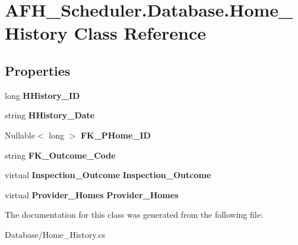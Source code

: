 \section{A\+F\+H\+\_\+\+Scheduler.\+Database.\+Home\+\_\+\+History Class Reference}
\label{class_a_f_h___scheduler_1_1_database_1_1_home___history}
\subsection*{Properties}
\begin{DoxyCompactItemize}
\item 
\mbox{\label{class_a_f_h___scheduler_1_1_database_1_1_home___history_a6df5c667b96b20f8f0eb28bf0d6c9b38}} 
long {\bfseries H\+History\+\_\+\+ID}\hspace{0.3cm}{\ttfamily  [get, set]}
\item 
\mbox{\label{class_a_f_h___scheduler_1_1_database_1_1_home___history_a6f54a9944d339511f33002573f4413a7}} 
string {\bfseries H\+History\+\_\+\+Date}\hspace{0.3cm}{\ttfamily  [get, set]}
\item 
\mbox{\label{class_a_f_h___scheduler_1_1_database_1_1_home___history_a2341086ad66cff5cdb05bf473aa4902c}} 
Nullable$<$ long $>$ {\bfseries F\+K\+\_\+\+P\+Home\+\_\+\+ID}\hspace{0.3cm}{\ttfamily  [get, set]}
\item 
\mbox{\label{class_a_f_h___scheduler_1_1_database_1_1_home___history_a74e28ce982820a39af9b61bff7c36a23}} 
string {\bfseries F\+K\+\_\+\+Outcome\+\_\+\+Code}\hspace{0.3cm}{\ttfamily  [get, set]}
\item 
\mbox{\label{class_a_f_h___scheduler_1_1_database_1_1_home___history_ae1d88258f13d6bef3988231b8e91a3f1}} 
virtual \textbf{ Inspection\+\_\+\+Outcome} {\bfseries Inspection\+\_\+\+Outcome}\hspace{0.3cm}{\ttfamily  [get, set]}
\item 
\mbox{\label{class_a_f_h___scheduler_1_1_database_1_1_home___history_a8438082e5d2fd9d8b9484d9269b9ca67}} 
virtual \textbf{ Provider\+\_\+\+Homes} {\bfseries Provider\+\_\+\+Homes}\hspace{0.3cm}{\ttfamily  [get, set]}
\end{DoxyCompactItemize}


The documentation for this class was generated from the following file\+:\begin{DoxyCompactItemize}
\item 
Database/Home\+\_\+\+History.\+cs\end{DoxyCompactItemize}

